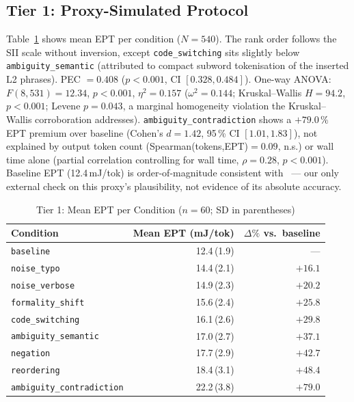 \documentclass[conference]{IEEEtran}
\begin{document}
\subsection{Tier 1: Proxy-Simulated Protocol}
\label{sec:results-stage1}
Table~\ref{tab:ept} shows mean EPT per condition ($N=540$). The rank
order follows the SII scale without inversion, except
\texttt{code\_switching} sits slightly below \texttt{ambiguity\_semantic}
(attributed to compact subword tokenisation of the inserted L2
phrases). PEC $=0.408$ ($p<0.001$, CI $[0.328,0.484]$). One-way ANOVA:
$F(8,531)=12.34$, $p<0.001$, $\eta^2=0.157$ ($\omega^2=0.144$;
Kruskal--Wallis $H=94.2$, $p<0.001$; Levene $p=0.043$, a marginal
homogeneity violation the Kruskal--Wallis corroboration addresses).
\texttt{ambiguity\_contradiction} shows a $+79.0\,\%$ EPT premium over
baseline (Cohen's $d=1.42$, 95\,\% CI $[1.01,1.83]$), not explained by
output token count (Spearman(tokens,EPT)$=0.09$, n.s.) or wall time
alone (partial correlation controlling for wall time, $\rho=0.28$,
$p<0.001$). Baseline EPT (12.4\,mJ/tok) is order-of-magnitude
consistent with~\cite{samsi2023words,faiz2024llmcarbon} --- our only
external check on this proxy's plausibility, not evidence of its
absolute accuracy.
\begin{table}[t]
\caption{Tier 1: Mean EPT per Condition ($n=60$; SD in parentheses)}
\label{tab:ept}
\centering
\setlength{\tabcolsep}{3pt}
\begin{tabular}{@{}lrr@{}}
\toprule
\textbf{Condition} & \textbf{Mean EPT (mJ/tok)} & \textbf{$\Delta\%$ vs.\ baseline} \\
\midrule
\texttt{baseline} & 12.4\,(1.9) & --- \\
\texttt{noise\_typo} & 14.4\,(2.1) & $+16.1$ \\
\texttt{noise\_verbose} & 14.9\,(2.3) & $+20.2$ \\
\texttt{formality\_shift} & 15.6\,(2.4) & $+25.8$ \\
\texttt{code\_switching} & 16.1\,(2.6) & $+29.8$ \\
\texttt{ambiguity\_semantic} & 17.0\,(2.7) & $+37.1$ \\
\texttt{negation} & 17.7\,(2.9) & $+42.7$ \\
\texttt{reordering} & 18.4\,(3.1) & $+48.4$ \\
\texttt{ambiguity\_contradiction} & 22.2\,(3.8) & $+79.0$ \\
\bottomrule
\end{tabular}
\end{table}
\end{document}
